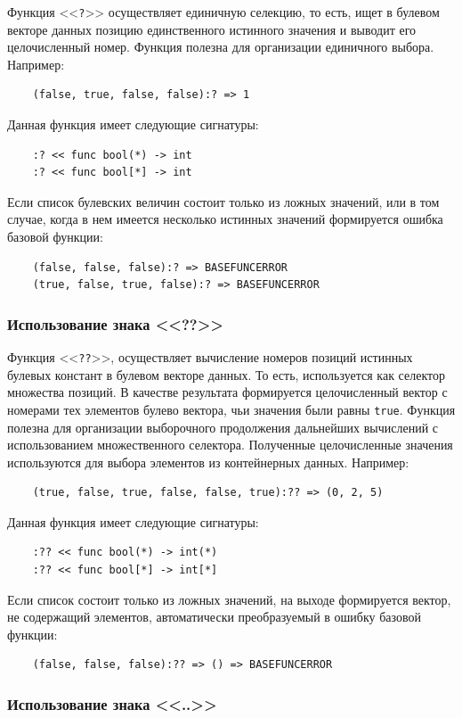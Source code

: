 Функция <<\verb|?|>> осуществляет единичную селекцию, то есть, ищет в булевом векторе данных позицию единственного истинного значения и выводит его целочисленный номер. Функция полезна для организации единичного выбора. Например:
\begin{verbatim}
    (false, true, false, false):? => 1
\end{verbatim}
Данная функция имеет следующие сигнатуры:
\begin{verbatim}
    :? << func bool(*) -> int
    :? << func bool[*] -> int
\end{verbatim}
Если список булевских величин состоит только из ложных значений, или в том случае, когда в нем имеется несколько истинных значений формируется ошибка базовой функции:
\begin{verbatim}
    (false, false, false):? => BASEFUNCERROR
    (true, false, true, false):? => BASEFUNCERROR
\end{verbatim}

\subsubsection{Использование знака <<??>>}

Функция <<\verb|??|>>, осуществляет вычисление номеров позиций истинных булевых констант в булевом векторе данных. То есть, используется как селектор множества позиций. В качестве результата формируется целочисленный вектор с номерами тех элементов булево вектора, чьи значения были равны \verb|true|. Функция полезна для организации выборочного продолжения дальнейших вычислений с использованием множественного селектора. Полученные целочисленные значения используются для выбора элементов из контейнерных данных. Например:
\begin{verbatim}
    (true, false, true, false, false, true):?? => (0, 2, 5)
\end{verbatim}
Данная функция имеет следующие сигнатуры:
\begin{verbatim}
    :?? << func bool(*) -> int(*)
    :?? << func bool[*] -> int[*]
\end{verbatim}
Если список состоит только из ложных значений, на выходе формируется вектор, не содержащий элементов, автоматически преобразуемый в ошибку базовой функции:
\begin{verbatim}
    (false, false, false):?? => () => BASEFUNCERROR
\end{verbatim}

\subsubsection{Использование знака <<..>>}

